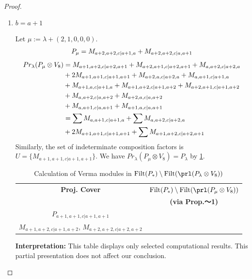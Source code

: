 \begin{proof}
\begin{enumerate}
\begin{enumerate}
        \item $b=a+1$ \par
        Let $\mu:=\lambda + (2,1,0,0,0) $.
        \begin{equation}\notag
          \begin{aligned}
            P_\mu = M_{a+2,a+2,c|a+1,a}
+ M_{a+2,a+2,c|a,a+1}
          \end{aligned}
        \end{equation}
        \begin{equation}\notag
          \begin{aligned}
            Pr_{\lambda}(P_\mu \otimes V_{8}) &=
M_{a+1,a+2,c|a+2,a+1}
+ M_{a+2,a+1,c|a+2,a+1}
+ M_{a,a+2,c|a+2,a}\\
                                              &
+ 2M_{a+1,a+1,c|a+1,a+1}
+ M_{a+2,a,c|a+2,a}
+ M_{a,a+1,c|a+1,a}\\
                                              &
+ M_{a+1,a,c|a+1,a}
+ M_{a+1,a+2,c|a+1,a+2}
+ M_{a+2,a+1,c|a+1,a+2}\\
                                              &
+ M_{a,a+2,c|a,a+2}
+ M_{a+2,a,c|a,a+2}\\
                                              &
+ M_{a,a+1,c|a,a+1}
+ M_{a+1,a,c|a,a+1} \\
                                               &=
\sum M_{a,a+1,c|a+1,a}
+ \sum M_{a,a+2,c|a+2,a}\\
                                               &
+ 2 M_{a+1,a+1,c|a+1,a+1}
+ \sum M_{a+1,a+2,c|a+2,a+1}
          \end{aligned}
        \end{equation}
      Similarly, the set of indeterminate composition factors is $U = \{
M_{a+1,a+1,c|a+1,a+1}
\}$. We have $Pr_{\lambda}(P_\mu \otimes V_{8}) = P_\lambda  $ by \cref{tab:verma-analysis_d_3}.
\begin{table}[htbp]
\centering
\caption{Calculation of Verma modules in $\operatorname{Filt}(P_*) \setminus \operatorname{Filt}(\prl(P_\lambda \otimes V_{8})) $ } \label{tab:verma-analysis_d_3}
\begin{tabular}{cc}
\toprule
\textbf{Proj. Cover} & \textbf{$\operatorname{Filt}(P_*) \setminus \operatorname{Filt}(\prl(P_\mu \otimes V_{8})) $}  \\
     & \textbf{(via Prop.～1)}  \\
\midrule
 $P_{a+1,a+1,c|a+1,a+1}$ & \makecell{
 $M_{a+2,a+1,c|a+2,a+1}$,
 $M_{a+2,a+1,c|a+1,a+2}$,
 $M_{a+1,a+2,c|a+2,a+1}$,\\
 $M_{a+1,a+2,c|a+1,a+2}$, 
 $M_{a+2,a+2,c|a+2,a+2}$
}\\
\bottomrule
\end{tabular}
\vspace{0.5em}
\parbox{\linewidth}{\small
\textbf{Interpretation:}
This table displays only selected computational results. This partial presentation does not affect our conclusion.
}
\end{table}
      \end{enumerate}


\end{enumerate}
\end{proof}
